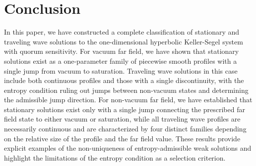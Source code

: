 \documentclass[12pt]{article}
\theoremstyle{definition}
\theoremstyle{remark}
\numberwithin{equation}{section}
\begin{document}
\section{Conclusion}
In this paper, we have constructed a complete classification of stationary and traveling wave solutions to the one-dimensional hyperbolic Keller-Segel system with quorum sensitivity. For vacuum far field, we have shown that stationary solutions exist as a one-parameter family of piecewise smooth profiles with a single jump from vacuum to saturation. Traveling wave solutions in this case include both continuous profiles and those with a single discontinuity, with the entropy condition ruling out jumps between non-vacuum states and determining the admissible jump direction. For non-vacuum far field, we have established that stationary solutions exist only with a single jump connecting the prescribed far field state to either vacuum or saturation, while all traveling wave profiles are necessarily continuous and are characterized by four distinct families depending on the relative size of the profile and the far field value. These results provide explicit examples of the non-uniqueness of entropy-admissible weak solutions and highlight the limitations of the entropy condition as a selection criterion.





\end{document}
